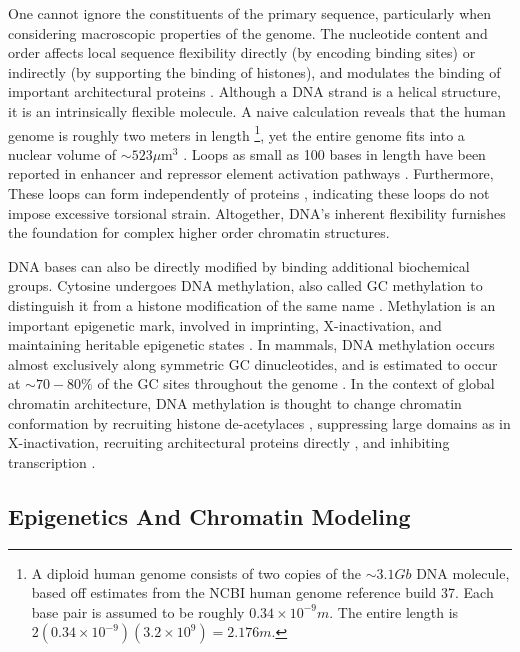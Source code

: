 One cannot ignore the constituents of the primary sequence, particularly when considering macroscopic properties of the genome.  The nucleotide content and
order affects local sequence flexibility directly (by encoding binding sites) or indirectly (by supporting the binding of histones), and
modulates the binding of important architectural proteins \citep{travers2004}.  Although a \gls{DNA} strand is a helical structure, it is an intrinsically
flexible molecule.  A naive calculation reveals that the human genome is roughly two meters in length%
\footnote{%
  A diploid human genome consists of two copies of the $\sim3.1Gb$ DNA molecule, based off estimates from the \gls{NCBI} human genome reference build 37.
  Each base pair is assumed to be roughly $0.34\times10^{-9}m$.  The entire length is $2(0.34 \times 10^{-9})(3.2 \times 10^9) = 2.176m$.
},
yet the entire genome fits into a nuclear volume of $\sim523\mu$m$^3$ \citep{marks2011}.  Loops as small as 100 bases in length have been
reported in enhancer and repressor element activation pathways \citep{wong2008}.  Furthermore, These loops can form independently of proteins
\citep{vafabakhsh2012}, indicating these loops do not impose excessive torsional strain.  Altogether, \gls{DNA}'s inherent flexibility furnishes the
foundation for complex higher order chromatin structures.

\gls{DNA} bases can also be directly modified by binding additional biochemical groups.  Cytosine undergoes \gls{DNA} methylation, also called GC methylation
to distinguish it from a histone modification of the same name \citep{bird2002}.  Methylation is an important epigenetic mark, involved in imprinting,
\gls{X-inactivation}, and maintaining heritable epigenetic states \citep{law2010}.  In mammals, \gls{DNA} methylation occurs almost exclusively along
symmetric \gls{GC} dinucleotides, and is estimated to occur at $\sim70-80\%$ of the \gls{GC} sites throughout the genome \citep{ehrlich1982,law2010}.
In the context of global chromatin architecture, \gls{DNA} methylation is thought to change chromatin conformation by recruiting histone
de-acetylaces \citep{schubeler2000}, suppressing large domains as in X-inactivation, recruiting architectural proteins directly \citep{yu2000},
and inhibiting transcription \citep{kass1997}.

\subsection*{Epigenetics And Chromatin Modeling}

